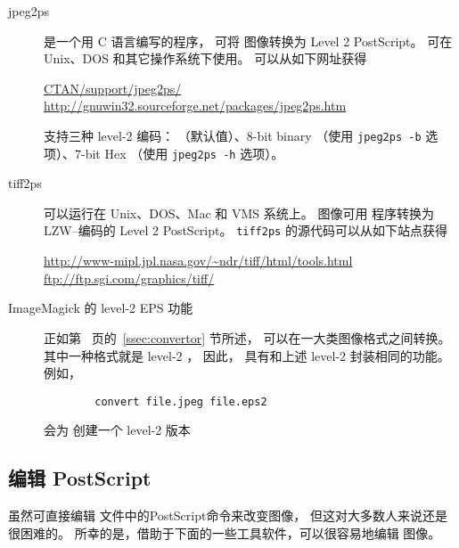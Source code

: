\begin{description}
	\item[jpeg2ps] 
	
	 是一个用 C 语言编写的程序，
	可将 图像转换为 Level 2 PostScript。
	 可在 Unix、DOS 和其它操作系统下使用。
	 可以从如下网址获得
	\begin{center}
		\href{http://www.ctan.org/tex-archive/support/jpeg2ps}{CTAN/support/jpeg2ps/}\\
		\url{http://gnuwin32.sourceforge.net/packages/jpeg2ps.htm}
	\end{center}
	
	 支持三种 level-2 编码：
	 （默认值）、8-bit binary （使用 \verb|jpeg2ps -b| 选项）、7-bit \ascii Hex （使用 \verb|jpeg2ps -h| 选项）。

	\item[tiff2ps]
	
	 可以运行在 Unix、DOS、Mac 和 VMS 系统上。
	 图像可用 程序转换为 LZW--编码的 Level 2 PostScript。
	\texttt{tiff2ps} 的源代码可以从如下站点获得
	\begin{center}
		\url{http://www-mipl.jpl.nasa.gov/~ndr/tiff/html/tools.html}\\
		\url{ftp://ftp.sgi.com/graphics/tiff/}
	\end{center}
	
	\item[ImageMagick 的 level-2 EPS 功能]
	
	正如第~\pageref{ssec:convertor} 页的~\ref{ssec:convertor} 节所述，
	 可以在一大类图像格式之间转换。
	其中一种格式就是 level-2 ，
	因此， 具有和上述 level-2 封装相同的功能。
	例如，
\begin{verbatim}
		convert file.jpeg file.eps2
\end{verbatim}
	会为  创建一个 level-2  版本 
	
\end{description}

\subsection{编辑 PostScript}\label{ssec:editps}

虽然可直接编辑  文件中的PostScript命令来改变图像，
但这对大多数人来说还是很困难的。
所幸的是，借助于下面的一些工具软件，可以很容易地编辑  图像。

